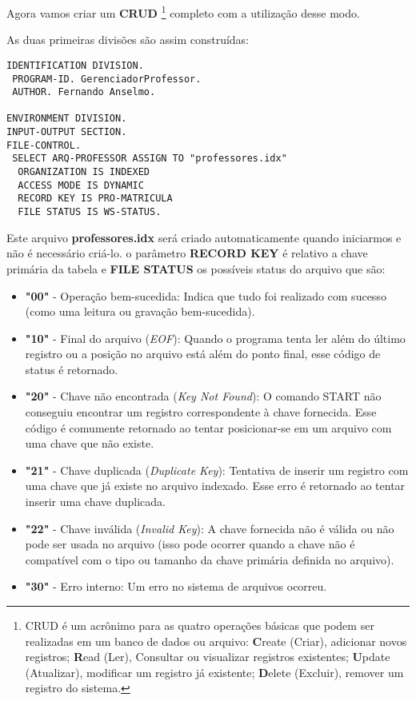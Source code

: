 Agora vamos criar um \textbf{CRUD} \footnote{CRUD é um acrônimo para as quatro operações básicas que podem ser realizadas em um banco de dados ou arquivo: \textbf{C}reate (Criar), adicionar novos registros; \textbf{R}ead (Ler), Consultar ou visualizar registros existentes; \textbf{U}pdate (Atualizar), modificar um registro já existente; \textbf{D}elete (Excluir), remover um registro do sistema.} completo com a utilização desse modo.

As duas primeiras divisões são assim construídas:
\begin{lstlisting}[]
IDENTIFICATION DIVISION.
 PROGRAM-ID. GerenciadorProfessor.
 AUTHOR. Fernando Anselmo.

ENVIRONMENT DIVISION.
INPUT-OUTPUT SECTION.
FILE-CONTROL.
 SELECT ARQ-PROFESSOR ASSIGN TO "professores.idx"
  ORGANIZATION IS INDEXED
  ACCESS MODE IS DYNAMIC
  RECORD KEY IS PRO-MATRICULA
  FILE STATUS IS WS-STATUS.
\end{lstlisting}

Este arquivo \textbf{professores.idx} será criado automaticamente quando iniciarmos e não é necessário criá-lo. o parâmetro \textbf{RECORD KEY} é relativo a chave primária da tabela e \textbf{FILE STATUS} os possíveis status do arquivo que são:

\begin{itemize}
	\item \textbf{"00"} - Operação bem-sucedida: Indica que tudo foi realizado com sucesso (como uma leitura ou gravação bem-sucedida).
	\item \textbf{"10"} - Final do arquivo (\textit{EOF}): Quando o programa tenta ler além do último registro ou a posição no arquivo está além do ponto final, esse código de status é retornado.
	\item \textbf{"20"} - Chave não encontrada (\textit{Key Not Found}): O comando START não conseguiu encontrar um registro correspondente à chave fornecida. Esse código é comumente retornado ao tentar posicionar-se em um arquivo com uma chave que não existe.
	\item \textbf{"21"} - Chave duplicada (\textit{Duplicate Key}): Tentativa de inserir um registro com uma chave que já existe no arquivo indexado. Esse erro é retornado ao tentar inserir uma chave duplicada.
	\item \textbf{"22"} - Chave inválida (\textit{Invalid Key}): A chave fornecida não é válida ou não pode ser usada no arquivo (isso pode ocorrer quando a chave não é compatível com o tipo ou tamanho da chave primária definida no arquivo).
	\item \textbf{"30"} - Erro interno: Um erro no sistema de arquivos ocorreu.
\end{itemize}

